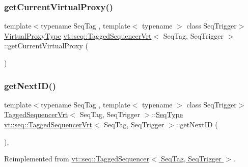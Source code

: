 \subsubsection{\texorpdfstring{get\+Current\+Virtual\+Proxy()}{getCurrentVirtualProxy()}}
{\footnotesize\ttfamily template$<$typename Seq\+Tag , template$<$ typename $>$ class Seq\+Trigger$>$ \\
\hyperlink{namespacevt_a1b417dd5d684f045bb58a0ede70045ac}{Virtual\+Proxy\+Type} \hyperlink{structvt_1_1seq_1_1_tagged_sequencer_vrt}{vt\+::seq\+::\+Tagged\+Sequencer\+Vrt}$<$ Seq\+Tag, Seq\+Trigger $>$\+::get\+Current\+Virtual\+Proxy (\begin{DoxyParamCaption}{ }\end{DoxyParamCaption})}

\mbox{\label{structvt_1_1seq_1_1_tagged_sequencer_vrt_a2dff0d8c70573a608c199b81657a19cb}} 
\subsubsection{\texorpdfstring{get\+Next\+I\+D()}{getNextID()}}
{\footnotesize\ttfamily template$<$typename Seq\+Tag , template$<$ typename $>$ class Seq\+Trigger$>$ \\
\hyperlink{structvt_1_1seq_1_1_tagged_sequencer_vrt}{Tagged\+Sequencer\+Vrt}$<$ Seq\+Tag, Seq\+Trigger $>$\+::\hyperlink{structvt_1_1seq_1_1_tagged_sequencer_a1c8ee839258d0f88c49ef660267a81d5}{Seq\+Type} \hyperlink{structvt_1_1seq_1_1_tagged_sequencer_vrt}{vt\+::seq\+::\+Tagged\+Sequencer\+Vrt}$<$ Seq\+Tag, Seq\+Trigger $>$\+::get\+Next\+ID (\begin{DoxyParamCaption}{ }\end{DoxyParamCaption})\hspace{0.3cm}{\ttfamily [override]}, {\ttfamily [virtual]}}



Reimplemented from \hyperlink{structvt_1_1seq_1_1_tagged_sequencer_a243149e1efcc57ae08fb265b09ef9a60}{vt\+::seq\+::\+Tagged\+Sequencer$<$ Seq\+Tag, Seq\+Trigger $>$}.

\mbox{\label{structvt_1_1seq_1_1_tagged_sequencer_vrt_aae7a0943397b44e3f43160008e2b8d42}} 
